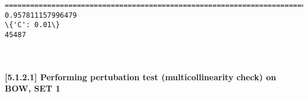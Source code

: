 \documentclass[11pt]{article}
\begin{document}
    \begin{Verbatim}[commandchars=\\\{\}]
====================================================================================================
0.957811157996479
\{'C': 0.01\}
45487

    \end{Verbatim}

    \begin{center}
    \end{center}
    { \hspace*{\fill} \\}
    
    \paragraph{{[}5.1.2.1{]} Performing pertubation test (multicollinearity
check) on BOW, SET
1}\label{performing-pertubation-test-multicollinearity-check-on-bow-set-1}
\end{document}
